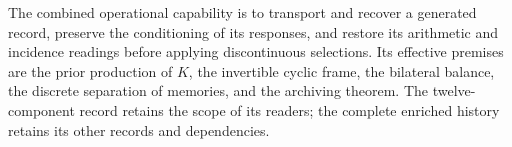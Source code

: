 The combined operational capability is to transport and recover a generated
record, preserve the conditioning of its responses, and restore
its arithmetic and incidence readings before applying discontinuous
selections. Its effective premises are the prior production of
\(K\), the invertible cyclic frame, the bilateral balance, the
discrete separation of memories, and the archiving theorem. The
twelve-component record retains the scope of its readers;
the complete enriched history retains its other records and
dependencies.
